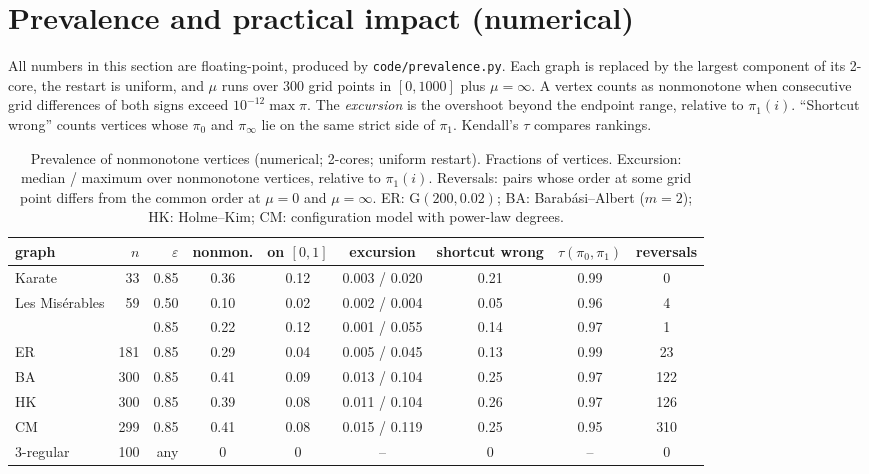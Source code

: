 \documentclass[11pt,a4paper]{article}
\theoremstyle{definition}\newtheorem{conjecture}{Conjecture}
\theoremstyle{remark}\newtheorem{remark}[theorem]{Remark}
\newcommand{\eps}{\varepsilon}
\begin{document}
\section{Prevalence and practical impact (numerical)}\label{sec:prevalence}
All numbers in this section are floating-point, produced by \texttt{code/prevalence.py}. Each graph is replaced by the largest component of its 2-core, the restart is uniform, and $\mu$ runs over $300$ grid points in $[0,1000]$ plus $\mu=\infty$. A vertex counts as nonmonotone when consecutive grid differences of both signs exceed $10^{-12}\max\pi$. The \emph{excursion} is the overshoot beyond the endpoint range, relative to $\pi_1(i)$. ``Shortcut wrong'' counts vertices whose $\pi_0$ and $\pi_\infty$ lie on the same strict side of $\pi_1$. Kendall's $\tau$ compares rankings.

\begin{table}[htbp]
\centering\small
\caption{Prevalence of nonmonotone vertices (numerical; 2-cores; uniform restart). Fractions of vertices. Excursion: median / maximum over nonmonotone vertices, relative to $\pi_1(i)$. Reversals: pairs whose order at some grid point differs from the common order at $\mu=0$ and $\mu=\infty$. ER: G$(200,0.02)$; BA: Barab\'asi--Albert ($m=2$); HK: Holme--Kim; CM: configuration model with power-law degrees.}\label{tab:prevalence}
\setlength{\tabcolsep}{4pt}
\begin{tabular}{@{}lrrcccccc@{}}
\toprule
graph & $n$ & $\eps$ & nonmon. & on $[0,1]$ & excursion & shortcut wrong & $\tau(\pi_0,\pi_1)$ & reversals\\
\midrule
Karate & 33 & 0.85 & 0.36 & 0.12 & 0.003 / 0.020 & 0.21 & 0.99 & 0\\
Les Mis\'erables & 59 & 0.50 & 0.10 & 0.02 & 0.002 / 0.004 & 0.05 & 0.96 & 4\\
 & & 0.85 & 0.22 & 0.12 & 0.001 / 0.055 & 0.14 & 0.97 & 1\\
ER & 181 & 0.85 & 0.29 & 0.04 & 0.005 / 0.045 & 0.13 & 0.99 & 23\\
BA & 300 & 0.85 & 0.41 & 0.09 & 0.013 / 0.104 & 0.25 & 0.97 & 122\\
HK & 300 & 0.85 & 0.39 & 0.08 & 0.011 / 0.104 & 0.26 & 0.97 & 126\\
CM & 299 & 0.85 & 0.41 & 0.08 & 0.015 / 0.119 & 0.25 & 0.95 & 310\\
3-regular & 100 & any & 0 & 0 & -- & 0 & -- & 0\\
\bottomrule
\end{tabular}
\end{table}
\end{document}
